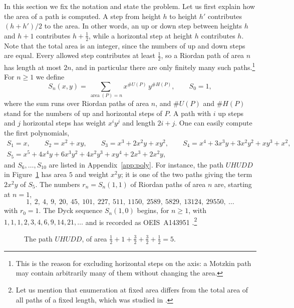 \documentclass[11pt,reqno]{amsart}
\numberwithin{equation}{section}
\theoremstyle{remark}
\newcommand{\area}{\operatorname{area}}
\begin{document}
In this section we fix the notation and state the problem. Let us first explain how the
area of a path is computed. A step from height $h$ to height $h'$ contributes $(h+h')/2$
to the area. In other words, an up or down step between heights $h$ and $h+1$ contributes
$h+\tfrac12$, while a horizontal step at height $h$ contributes $h$. Note that the total
area is an integer, since the numbers of up and down steps are equal. Every allowed step
contributes at least $\tfrac12$, so a Riordan path of area $n$ has length at most $2n$,
and in particular there are only finitely many such paths.\footnote{This is the reason
for excluding horizontal steps on the axis: a Motzkin path may contain arbitrarily many
of them without changing the area.} For $n\ge1$ we define
\begin{equation}
S_n(x,y)=\sum_{\area(P)=n}x^{\#U(P)}\,y^{\#H(P)},\qquad S_0=1,
\end{equation}
where the sum runs over Riordan paths of area $n$, and $\#U(P)$ and $\#H(P)$ stand for the
numbers of up and horizontal steps of $P$. A path with $i$ up steps and $j$ horizontal
steps has weight $x^iy^j$ and length $2i+j$. One can easily compute the first polynomials,
\begin{gather*}
S_1=x,\qquad S_2=x^2+xy,\qquad S_3=x^3+2x^2y+xy^2,\qquad S_4=x^4+3x^3y+3x^2y^2+xy^3+x^2,\\
S_5=x^5+4x^4y+6x^3y^2+4x^2y^3+xy^4+2x^3+2x^2y,
\end{gather*}
and $S_6,\dots,S_{10}$ are listed in Appendix~\ref{app:poly}. For instance, the path
$UHUDD$ in Figure~\ref{fig:path} has area $5$ and weight $x^2y$; it is one of the two
paths giving the term $2x^2y$ of $S_5$. The numbers $r_n=S_n(1,1)$ of Riordan paths of
area $n$ are, starting at $n=1$,
\begin{equation}\label{eq:rn}
1,\ 2,\ 4,\ 9,\ 20,\ 45,\ 101,\ 227,\ 511,\ 1150,\ 2589,\ 5829,\ 13124,\ 29550,\ \dots
\end{equation}
with $r_0=1$. The Dyck sequence $S_n(1,0)$ begins, for $n\ge1$, with
$1,1,1,2,3,4,6,9,14,21,\dots$ and is recorded as OEIS~A143951
\cite{OEIS}.\footnote{Let us mention that enumeration at fixed area differs from the total
area of all paths of a fixed length, which was studied in \cite{Bu23,Merlini03}.}

\begin{figure}[htb]
\centering
{}
\caption{The path $UHUDD$, of area $\tfrac12+1+\tfrac32+\tfrac32+\tfrac12=5$.}
\label{fig:path}
\end{figure}
\end{document}
